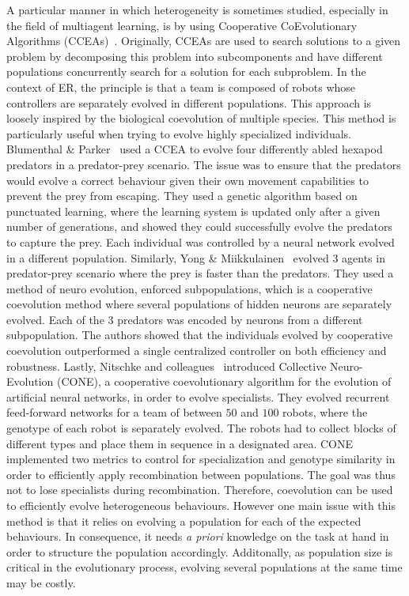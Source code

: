     A particular manner in which heterogeneity is sometimes studied, especially in the field of multiagent learning, is by using Cooperative CoEvolutionary Algorithms (CCEAs)~\parencite{Potter1994}. Originally, CCEAs are used to search solutions to a given problem by decomposing this problem into subcomponents and have different populations concurrently search for a solution for each subproblem. In the context of ER, the principle is that a team is composed of robots whose controllers are separately evolved in different populations. This approach is loosely inspired by the biological coevolution of multiple species. This method is particularly useful when trying to evolve highly specialized individuals. Blumenthal \& Parker~\parencite{Blumenthal2004} used a CCEA to evolve four differently abled hexapod predators in a predator-prey scenario. The issue was to ensure that the predators would evolve a correct behaviour given their own movement capabilities to prevent the prey from escaping. They used a genetic algorithm based on punctuated learning, where the learning system is updated only after a given number of generations, and showed they could successfully evolve the predators to capture the prey. Each individual was controlled by a neural network evolved in a different population. Similarly, Yong \& Miikkulainen~\parencite{Yong2009} evolved $3$ agents in predator-prey scenario where the prey is faster than the predators. They used a method of neuro evolution, enforced subpopulations, which is a cooperative coevolution method where several populations of hidden neurons are separately evolved. Each of the $3$ predators was encoded by neurons from a different subpopulation. The authors showed that the individuals evolved by cooperative coevolution outperformed a single centralized controller on both efficiency and robustness. Lastly, Nitschke and colleagues~\parencite{Nitschke2012} introduced Collective Neuro-Evolution (CONE), a cooperative coevolutionary algorithm for the evolution of artificial neural networks, in order to evolve specialists. They evolved recurrent feed-forward networks for a team of between $50$ and $100$ robots, where the genotype of each robot is separately evolved. The robots had to collect blocks of different types and place them in sequence in a designated area. CONE implemented two metrics to control for specialization and genotype similarity in order to efficiently apply recombination between populations. The goal was thus not to lose specialists during recombination. Therefore, coevolution can be used to efficiently evolve heterogeneous behaviours. However one main issue with this method is that it relies on evolving a population for each of the expected behaviours. In consequence, it needs \emph{a priori} knowledge on the task at hand in order to structure the population accordingly. Additonally, as population size is critical in the evolutionary process, evolving several populations at the same time may be costly.

